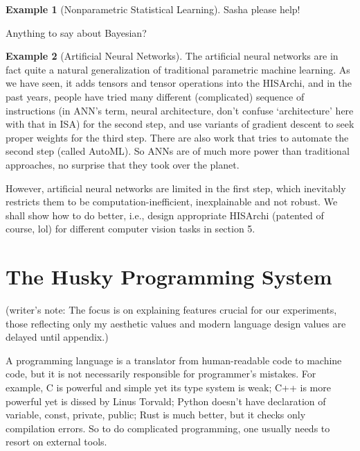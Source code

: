 \documentclass[10pt, oneside]{article}   	%
\theoremstyle{definition}
\newtheorem*{eg}{Example}
\begin{document}
\begin{eg}
	[Nonparametric Statistical Learning]

	Sasha please help!
\end{eg}
Anything to say about Bayesian?
\begin{eg}[Artificial Neural Networks]
	The artificial neural networks are in fact quite a natural generalization of traditional parametric machine learning. As we have seen, it adds tensors and tensor operations into the HISArchi, and in the past years, people have tried many different (complicated) sequence of instructions (in ANN's term, neural architecture, don't confuse `architecture' here with that in ISA) for the second step, and use variants of gradient descent to seek proper weights for the third step. There are also work that tries to automate the second step (called AutoML). So ANNs are of much more power than traditional approaches, no surprise that they took over the planet.

	However, artificial neural networks are limited in the first step, which inevitably restricts them to be computation-inefficient, inexplainable and not robust. We shall show how to do better, i.e., design appropriate HISArchi (patented of course, lol) for different computer vision tasks in section 5.
\end{eg}





































\section{The Husky Programming System}
(writer's note: The focus is on explaining features crucial for our experiments, those reflecting only my aesthetic values and modern language design values are delayed until appendix.)

A programming language is a translator from human-readable code to machine code, but it is not necessarily responsible for programmer's mistakes. For example, C is powerful and simple yet its type system is weak; C++ is more powerful yet is dissed by Linus Torvald; Python doesn't have declaration of variable, const, private, public; Rust is much better, but it checks only compilation errors. So to do complicated programming, one usually needs to resort on external tools.
\end{document}
